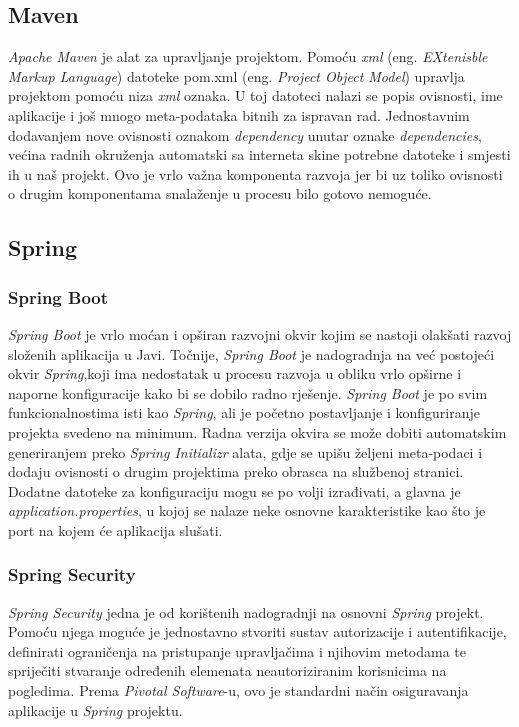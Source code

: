 \documentclass[zavrsni, numeric]{fer}
\begin{document}
\subsection{Maven}

\textit{Apache Maven}\citep{apache-maven} je alat za upravljanje projektom. Pomoću \textit{xml} (eng. \textit{EXtenisble Markup Language}) datoteke pom.xml (eng. \textit{Project Object Model}) upravlja projektom pomoću niza \textit{xml} oznaka. U toj datoteci nalazi se popis ovisnosti, ime aplikacije i još mnogo meta-podataka bitnih za ispravan rad. Jednostavnim dodavanjem nove ovisnosti oznakom \textit{dependency} unutar oznake \textit{dependencies}, većina radnih okruženja automatski sa interneta skine potrebne datoteke i smjesti ih u naš projekt. Ovo je vrlo važna komponenta razvoja jer bi uz toliko ovisnosti o drugim komponentama snalaženje u procesu bilo gotovo nemoguće.

\subsection{Spring}

\subsubsection{Spring Boot}
\textit{Spring Boot}\citep{spring-boot} je vrlo moćan i opširan razvojni okvir kojim se nastoji olakšati razvoj složenih aplikacija u Javi. Točnije, \textit{Spring Boot} je nadogradnja na već postojeći okvir \textit{Spring},koji ima nedostatak u procesu razvoja u obliku vrlo opširne i naporne konfiguracije kako bi se dobilo radno rješenje. \textit{Spring Boot} je po svim funkcionalnostima isti kao \textit{Spring}, ali je početno postavljanje i konfiguriranje projekta svedeno na minimum. Radna verzija okvira se može dobiti automatskim generiranjem preko \textit{Spring Initializr}\citep{spring-initializr} alata, gdje se upišu željeni meta-podaci i dodaju ovisnosti o drugim projektima preko obrasca na službenoj stranici. Dodatne datoteke za konfiguraciju mogu se po volji izrađivati, a glavna je \textit{application.properties}, u kojoj se nalaze neke osnovne karakteristike kao što je port na kojem će aplikacija slušati.

\subsubsection{Spring Security}
\textit{Spring Security}\citep{spring-security} jedna je od korištenih nadogradnji na osnovni \textit{Spring} projekt. Pomoću njega moguće je jednostavno stvoriti sustav autorizacije i autentifikacije, definirati ograničenja na pristupanje upravljačima i njihovim metodama te spriječiti stvaranje određenih elemenata neautoriziranim korisnicima na pogledima. Prema \textit{Pivotal Software}-u, ovo je standardni način osiguravanja aplikacije u \textit{Spring} projektu.
\end{document}
